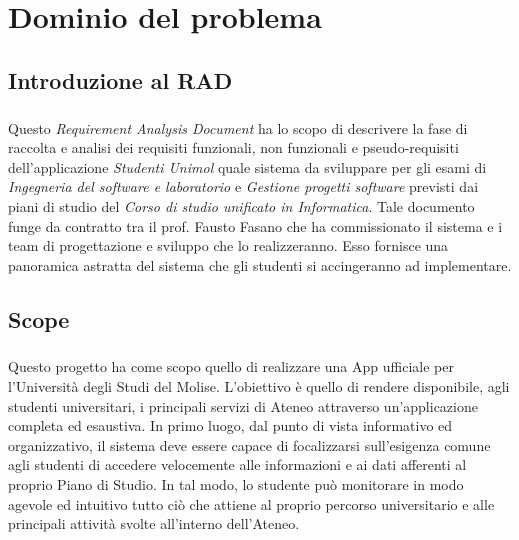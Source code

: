 \chapter{Dominio del problema}
\label{ref:Introduzione}

\section{Introduzione al RAD}

\paragraph{}
Questo \textit{Requirement Analysis Document} ha lo scopo di descrivere la fase di raccolta e analisi dei requisiti funzionali, non funzionali e pseudo-requisiti dell'applicazione \textit{Studenti Unimol} quale sistema da sviluppare per gli esami di \textit{Ingegneria del software e laboratorio} e \textit{Gestione progetti software} previsti dai piani di studio del \textit{Corso di studio unificato in Informatica}. Tale documento funge da contratto tra il prof. Fausto Fasano che ha commissionato il sistema e i team di progettazione e sviluppo che lo realizzeranno. Esso fornisce una panoramica astratta del sistema che gli studenti si accingeranno ad implementare.

\section{Scope}

\paragraph{}
Questo progetto ha come scopo quello di realizzare una App ufficiale per l’Università degli Studi del Molise. L’obiettivo è quello di rendere disponibile, agli studenti universitari, i principali servizi di Ateneo attraverso un’applicazione completa ed esaustiva.
In primo luogo, dal punto di vista informativo ed organizzativo, il sistema deve essere capace di focalizzarsi sull’esigenza comune agli studenti di accedere velocemente alle informazioni e ai dati afferenti al proprio Piano di Studio. In tal modo, lo studente può monitorare in modo agevole ed intuitivo tutto ciò che attiene al proprio percorso universitario e alle principali attività svolte all'interno dell'Ateneo.

